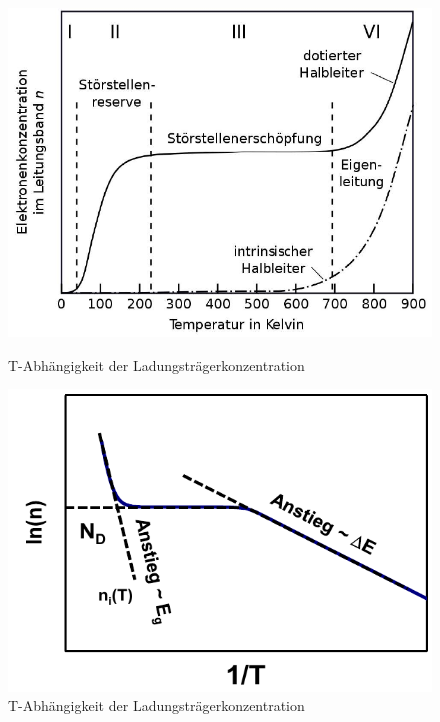 		\begin{figure}[h!]
			\centering
			\begin{minipage}[t]{0.45\linewidth}
				\centering
				\includegraphics[width=\textwidth]{Kapitel/Kap02/tempAbh2.PNG}
				\caption{T-Abhängigkeit der Ladungsträgerkonzentration}
				\label{02_tempAbh3}
			\end{minipage}%
			\hfill
			\begin{minipage}[t]{0.45\linewidth}
				\centering
				\includegraphics[width=\textwidth]{Kapitel/Kap02/tempAbh3.PNG}
				\caption{T-Abhängigkeit der Ladungsträgerkonzentration}
				\label{02_tempAbh4}
			\end{minipage}
		\end{figure}
		
